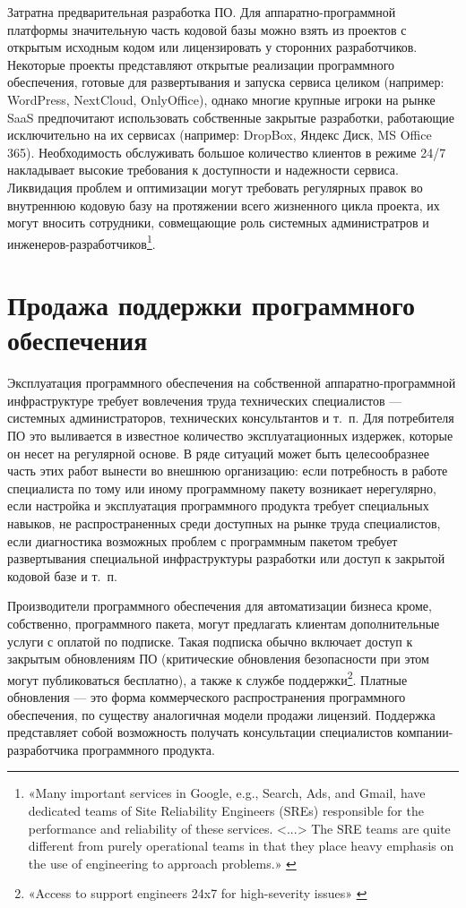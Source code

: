 \documentclass{article}
\begin{document}
Затратна предварительная разработка ПО. Для аппаратно-программной платформы значительную часть кодовой базы можно взять из проектов с открытым исходным кодом или лицензировать у сторонних разработчиков. Некоторые проекты представляют открытые реализации программного обеспечения, готовые для развертывания и запуска сервиса целиком (например: WordPress, NextCloud, OnlyOffice), однако многие крупные игроки на рынке SaaS предпочитают использовать собственные закрытые разработки, работающие исключительно на их сервисах (например: DropBox, Яндекс Диск, MS Office 365). Необходимость обслуживать большое количество клиентов в режиме 24/7 накладывает высокие требования к доступности и надежности сервиса. Ликвидация проблем и оптимизации могут требовать регулярных правок во внутреннюю кодовую базу на протяжении всего жизненного цикла проекта, их могут вносить сотрудники, совмещающие роль системных администратров и инженеров-разработчиков\footnote{«Many important services in Google, e.g., Search, Ads, and Gmail, have dedicated teams of Site Reliability Engineers (SREs) responsible for the performance and reliability of these services. <...> The SRE teams are quite different from purely operational teams in that they place heavy emphasis on the use of engineering to approach problems.» \cite{googleSRE}}.

\section*{Продажа поддержки программного обеспечения}

Эксплуатация программного обеспечения на собственной аппаратно-программной инфраструктуре требует вовлечения труда технических специалистов — системных администраторов, технических консультантов и т.~п. Для потребителя ПО это выливается в известное количество эксплуатационных издержек, которые он несет на регулярной основе. В ряде ситуаций может быть целесообразнее часть этих работ вынести во внешнюю организацию: если потребность в работе специалиста по тому или иному программному пакету возникает нерегулярно, если настройка и эксплуатация программного продукта требует специальных навыков, не распространенных среди доступных на рынке труда специалистов, если диагностика возможных проблем с программным пакетом требует развертывания специальной инфраструктуры разработки или доступ к закрытой кодовой базе и т.~п.

Производители программного обеспечения для автоматизации бизнеса кроме, собственно, программного пакета, могут предлагать клиентам дополнительные услуги с оплатой по подписке. Такая подписка обычно включает доступ к закрытым обновлениям ПО (критические обновления безопасности при этом могут публиковаться бесплатно), а также к службе поддержки\footnote{«Access to support engineers 24x7 for high-severity issues» \cite{redhatSubscriptionModel}}. Платные обновления — это форма коммерческого распространения программного обеспечения, по существу аналогичная модели продажи лицензий. Поддержка представляет собой возможность получать консультации специалистов компании-разработчика программного продукта.
\end{document}
